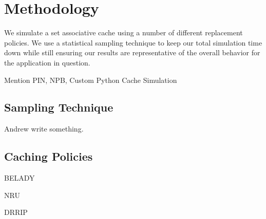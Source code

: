 \section{Methodology}
We simulate a set associative cache using a number of different
replacement policies.
We use a statistical sampling technique to keep our total simulation
time down while still ensuring our results are representative of the
overall behavior for the application in question.

Mention PIN, NPB, Custom Python Cache Simulation

\subsection{Sampling Technique}
Andrew write something.

\subsection{Caching Policies}
\label{sec:policies}
BELADY

NRU

DRRIP
